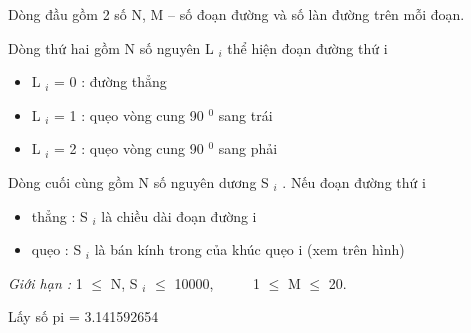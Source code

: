 Dòng đầu gồm 2 số N, M – số đoạn đường và số làn đường trên mỗi đoạn.

Dòng thứ hai gồm N số nguyên L $_ i $ thể hiện đoạn đường thứ i
\begin{itemize}
	\item L $_ i $ = 0 : đường thẳng
	\item L $_ i $ = 1 : quẹo vòng cung 90 $^ 0 $ sang trái
	\item L $_ i $ = 2 : quẹo vòng cung 90 $^ 0 $ sang phải
\end{itemize}

Dòng cuối cùng gồm N số nguyên dương S $_ i $ . Nếu đoạn đường thứ i
\begin{itemize}
	\item thẳng : S $_ i $ là chiều dài đoạn đường i
	\item quẹo : S $_ i $ là bán kính trong của khúc quẹo i (xem trên hình)
\end{itemize}

\emph{Giới hạn : } 1  $\le$  N, S $_ i $  $\le$  10000,       1  $\le$  M  $\le$  20.

Lấy số pi = 3.141592654